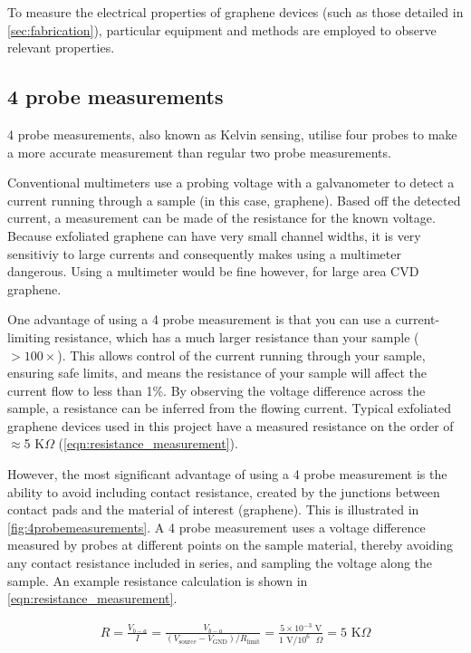 \documentclass[../../Matt_Gebert_Honours_Thesis.tex]{subfiles}
\begin{document}
	
	To measure the electrical properties of graphene devices (such as those detailed in \cref{sec:fabrication}), particular equipment and methods are employed to observe relevant properties. 
	
	\subsection{4 probe measurements}
	4 probe measurements, also known as Kelvin sensing, utilise four probes to make a more accurate measurement than regular two probe measurements. 
	
	Conventional multimeters use a probing voltage with a galvanometer to detect a current running through a sample (in this case, graphene). Based off the detected current, a measurement can be made of the resistance for the known voltage. Because exfoliated graphene can have very small channel widths, it is very sensitiviy to large currents and consequently makes using a multimeter dangerous. Using a multimeter would be fine however, for large area CVD graphene.
	
	One advantage of using a 4 probe measurement is that you can use a current-limiting resistance, which has a much larger resistance than your sample ($>100\times$). This allows control of the current running through your sample, ensuring safe limits, and means the resistance of your sample will affect the current flow to less than 1\%. By observing the voltage difference across the sample, a resistance can be inferred from the flowing current. Typical exfoliated graphene devices used in this project have a measured resistance on the order of $\approx$5 K$\Omega$ (\cref{eqn:resistance_measurement}).
	
	However, the most significant advantage of using a 4 probe measurement is the ability to avoid including contact resistance, created by the junctions between contact pads and the material of interest (graphene). This is illustrated in \cref{fig:4probemeasurements}.
	A 4 probe measurement uses a voltage difference measured by probes at different points on the sample material, thereby avoiding any contact resistance included in series, and sampling the voltage along the sample. An example resistance calculation is shown in \cref{eqn:resistance_measurement}.
	
	\begin{align}
	R = \frac{V_{b-a}}{I} = \frac{V_{b-a}}{\left(V_{\text{source}}-V_{\text{GND}}\right)/R_{\text{limit}}}  =\frac{5\times 10^{-3}\text{ V}}{1 \text{ V}/10^6 \text{ }\Omega} = 5 \text{ K}\Omega
	\label{eqn:resistance_measurement}
	\end{align}
	 
\end{document}
